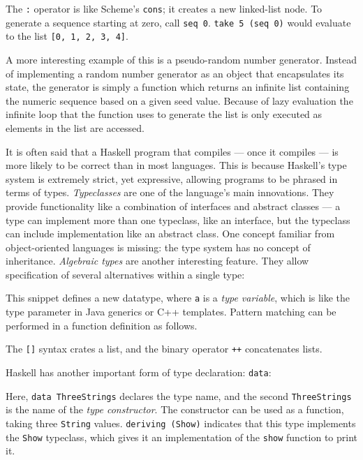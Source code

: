 \documentclass{article}
\begin{document}


\noindent The \verb!:! operator is like Scheme's \verb!cons!; it creates a new linked-list node.
To generate a sequence starting at zero, call \verb!seq 0!.
\verb!take 5 (seq 0)! would evaluate to the list \verb![0, 1, 2, 3, 4]!.

A more interesting example of this is a pseudo-random number generator.
Instead of implementing a random number generator as an object that encapsulates its state, the generator is simply a function which returns an infinite list containing the numeric sequence based on a given seed value.
Because of lazy evaluation the infinite loop that the function uses to generate the list is only executed as elements in the list are accessed.


It is often said that a Haskell program that compiles --- once it compiles --- is more likely to be correct than in most languages.
This is because Haskell's type system is extremely strict, yet expressive, allowing programs to be phrased in terms of types.
\textit{Typeclasses} are one of the language's main innovations\cite{hudak2007history}.
They provide functionality like a combination of interfaces and abstract classes --- a type can implement more than one typeclass, like an interface, but the typeclass can include implementation like an abstract class.
One concept familiar from object-oriented languages is missing: the type system has no concept of inheritance.
\textit{Algebraic types} are another interesting feature.
They allow specification of several alternatives within a single type:



\noindent This snippet defines a new datatype, where \verb!a! is a \textit{type variable}, which is like the type parameter in Java generics or C++ templates.
Pattern matching can be performed in a function definition as follows.



\noindent The \verb![]! syntax crates a list, and the binary operator \verb!++! concatenates lists.

Haskell has another important form of type declaration: \verb!data!:



\noindent Here, \verb!data ThreeStrings! declares the type name, and the second \verb!ThreeStrings! is the name of the \textit{type constructor}.  The constructor can be used as a function, taking three \verb!String! values.  \verb!deriving (Show)! indicates that this type implements the \verb!Show! typeclass, which gives it an implementation of the \verb!show! function to print it.
\end{document}
